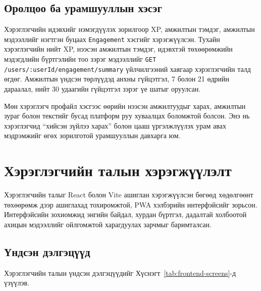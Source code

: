 \subsection{Оролцоо ба урамшууллын хэсэг}

Хэрэглэгчийн идэвхийг нэмэгдүүлэх зорилгоор XP, амжилтын тэмдэг, амжилтын мэдээллийг нэгтгэн буцаах \texttt{Engagement} хэсгийг хэрэгжүүлсэн. Тухайн хэрэглэгчийн нийт XP, нээсэн амжилтын тэмдэг, идэвхтэй төхөөрөмжийн мэдэгдлийн бүртгэлийн тоо зэрэг мэдээллийг \texttt{GET /users/:userId/engagement/summary} үйлчилгээний хаягаар хэрэглэгчийн талд өгдөг. Амжилтын үндсэн төрлүүдэд анхны гүйцэтгэл, 7 болон 21 өдрийн дараалал, нийт 30 удаагийн гүйцэтгэл зэрэг үе шатыг оруулсан.

Мөн хэрэглэгч профайл хэсгээс өөрийн нээсэн амжилтуудыг харах, амжилтын зураг болон текстийг бусад платформ руу хуваалцах боломжтой болсон. Энэ нь хэрэглэгчид ``хийсэн зүйлээ харах'' болон цааш үргэлжлүүлэх урам авах мэдрэмжийг өгөх зорилготой урамшууллын давхарга юм.

\section{Хэрэглэгчийн талын хэрэгжүүлэлт}

Хэрэглэгчийн талыг React болон Vite ашиглан хэрэгжүүлсэн бөгөөд хөдөлгөөнт төхөөрөмж дээр ашиглахад тохиромжтой, PWA хэлбэрийн интерфэйсийг зорьсон. Интерфэйсийн зохиомжид энгийн байдал, хурдан бүртгэл, дадалтай холбоотой ахицын мэдээллийг ойлгомжтой харагдуулах зарчмыг баримталсан.

\subsection{Үндсэн дэлгэцүүд}

Хэрэглэгчийн талын үндсэн дэлгэцүүдийг Хүснэгт~\ref{tab:frontend-screens}-д үзүүлэв.

